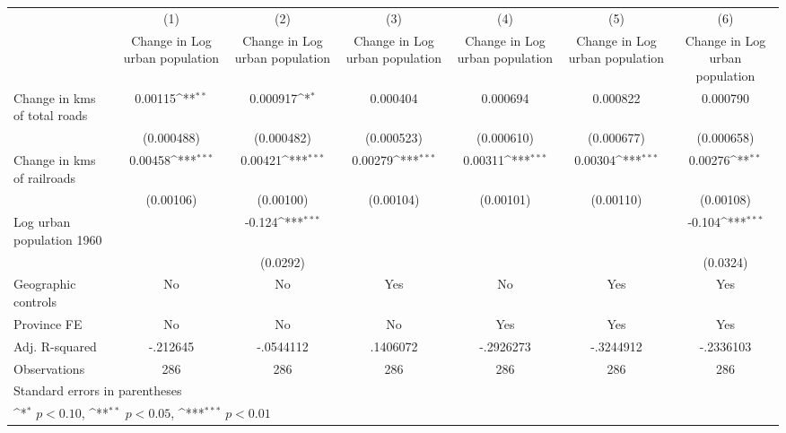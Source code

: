 {
\def\sym#1{\ifmmode^{#1}\else\(^{#1}\)\fi}
\begin{tabular}{l*{6}{c}}
\hline\hline
                    &\multicolumn{1}{c}{(1)}&\multicolumn{1}{c}{(2)}&\multicolumn{1}{c}{(3)}&\multicolumn{1}{c}{(4)}&\multicolumn{1}{c}{(5)}&\multicolumn{1}{c}{(6)}\\
                    &\multicolumn{1}{c}{Change in Log urban population}&\multicolumn{1}{c}{Change in Log urban population}&\multicolumn{1}{c}{Change in Log urban population}&\multicolumn{1}{c}{Change in Log urban population}&\multicolumn{1}{c}{Change in Log urban population}&\multicolumn{1}{c}{Change in Log urban population}\\
\hline
Change in kms of total roads&     0.00115\sym{**} &    0.000917\sym{*}  &    0.000404         &    0.000694         &    0.000822         &    0.000790         \\
                    &  (0.000488)         &  (0.000482)         &  (0.000523)         &  (0.000610)         &  (0.000677)         &  (0.000658)         \\
[1em]
Change in kms of railroads&     0.00458\sym{***}&     0.00421\sym{***}&     0.00279\sym{***}&     0.00311\sym{***}&     0.00304\sym{***}&     0.00276\sym{**} \\
                    &   (0.00106)         &   (0.00100)         &   (0.00104)         &   (0.00101)         &   (0.00110)         &   (0.00108)         \\
[1em]
Log urban population 1960&                     &      -0.124\sym{***}&                     &                     &                     &      -0.104\sym{***}\\
                    &                     &    (0.0292)         &                     &                     &                     &    (0.0324)         \\
\hline
Geographic controls &          No         &          No         &         Yes         &          No         &         Yes         &         Yes         \\
Province FE         &          No         &          No         &          No         &         Yes         &         Yes         &         Yes         \\
Adj. R-squared      &    -.212645         &   -.0544112         &    .1406072         &   -.2926273         &   -.3244912         &   -.2336103         \\
Observations        &         286         &         286         &         286         &         286         &         286         &         286         \\
\hline\hline
\multicolumn{7}{l}{\footnotesize Standard errors in parentheses}\\
\multicolumn{7}{l}{\footnotesize \sym{*} \(p<0.10\), \sym{**} \(p<0.05\), \sym{***} \(p<0.01\)}\\
\end{tabular}
}
